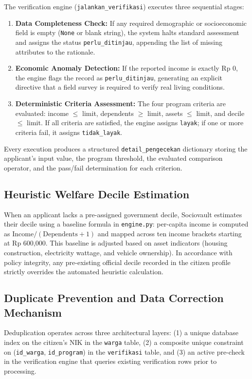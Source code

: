 \documentclass[runningheads]{llncs}
\begin{document}
The verification engine (\texttt{jalankan\_verifikasi}) executes three sequential stages:
\begin{enumerate}
    \item \textbf{Data Completeness Check:} If any required demographic or socioeconomic field is empty (\texttt{None} or blank string), the system halts standard assessment and assigns the status \texttt{perlu\_ditinjau}, appending the list of missing attributes to the rationale.
    \item \textbf{Economic Anomaly Detection:} If the reported income is exactly Rp 0, the engine flags the record as \texttt{perlu\_ditinjau}, generating an explicit directive that a field survey is required to verify real living conditions.
    \item \textbf{Deterministic Criteria Assessment:} The four program criteria are evaluated: income $\le$ limit, dependents $\ge$ limit, assets $\le$ limit, and decile $\le$ limit. If all criteria are satisfied, the engine assigns \texttt{layak}; if one or more criteria fail, it assigns \texttt{tidak\_layak}.
\end{enumerate}

Every execution produces a structured \texttt{detail\_pengecekan} dictionary storing the applicant's input value, the program threshold, the evaluated comparison operator, and the pass/fail determination for each criterion.

\subsection{Heuristic Welfare Decile Estimation}

When an applicant lacks a pre-assigned government decile, Sociovault estimates their decile using a baseline formula in \texttt{engine.py}: per-capita income is computed as $\text{Income} / (\text{Dependents} + 1)$ and mapped across ten income brackets starting at Rp 600,000. This baseline is adjusted based on asset indicators (housing construction, electricity wattage, and vehicle ownership). In accordance with policy integrity, any pre-existing official decile recorded in the citizen profile strictly overrides the automated heuristic calculation.

\subsection{Duplicate Prevention and Data Correction Mechanism}

Deduplication operates across three architectural layers: (1) a unique database index on the citizen's NIK in the \texttt{warga} table, (2) a composite unique constraint on (\texttt{id\_warga}, \texttt{id\_program}) in the \texttt{verifikasi} table, and (3) an active pre-check in the verification engine that queries existing verification rows prior to processing.
\end{document}

